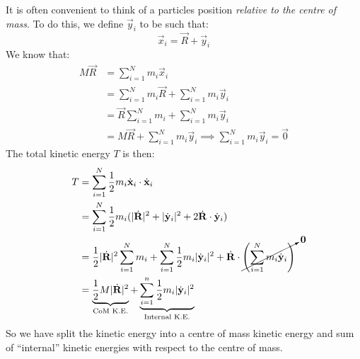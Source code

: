 \documentclass[../main.tex]{subfiles}
\begin{document}
It is often convenient to think of a particles position \textit{relative to the centre of mass}.
To do this, we define $\vec{y}_i$ to be such that:
\[
  \vec{x}_i = \vec{R} + \vec{y}_i
\]
We know that:
\begin{align}
  M\vec{R} &= \sum_{i = 1}^{N} m_i \vec{x}_i \nonumber \\
           &= \sum_{i = 1}^{N} m_i\vec{R} + \sum_{i = 1}^{N} m_i\vec{y}_i \nonumber \\
           &= \vec{R}\sum_{i = 1}^{N} m_i + \sum_{i = 1}^{N} m_i\vec{y}_i \nonumber \\
           &= M\vec{R} + \sum_{i = 1}^{N} m_i\vec{y}_i \implies \sum_{i = 1}^{N} m_i\vec{y}_i = \vec{0} \label{relativeSum}
\end{align}
The total kinetic energy $T$ is then:
\begin{align}
  T &= \sum_{i = 1}^{N} \frac{1}{2} m_i \dot{\vec{x}}_i \cdot \dot{\vec{x}}_i \nonumber \\
    &= \sum_{i = 1}^{N} \frac{1}{2} m_i (|\dot{\vec{R}}|^2 + |\dot{\vec{y}}_i|^2 + 2 \dot{\vec{R}} \cdot \dot{\vec{y}}_i) \nonumber \\
    &= \frac{1}{2} |\dot{\vec{R}}|^2\sum_{i = 1}^{N} m_i + \sum_{i = 1}^{N} \frac{1}{2} m_i |\dot{\vec{y}}_i|^2 + \dot{\vec{R}} \cdot\cancelto{\vec{0}}{\left(\sum_{i = 1}^{N} m_i\dot{\vec{y}}_i\right)} \nonumber \\
    &= \underbrace{\frac{1}{2}M |\dot{\vec{R}}|^2}_{\text{CoM K.E.}} + \underbrace{\sum_{i = 1}^{n} \frac{1}{2}m_i |\dot{\vec{y}}_i|^2}_{\text{Internal K.E.}} \label{totalKE}
\end{align}
So we have split the kinetic energy into a centre of mass kinetic energy and sum of ``internal'' kinetic energies with respect to the centre of mass.
\end{document}
